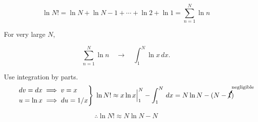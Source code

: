 
\begin{equation}
    \ln{N!} = \ln{N}+\ln{N-1}+\cdots+\ln{2}+\ln{1}=\sum^N_{n=1}\ln{n}
\end{equation}

For very large $N$,

\begin{equation}
    \sum^N_{n=1}\ln{n} \quad \longrightarrow  \quad \int_{1}^{N} \ln{x} \,dx .
\end{equation}

Use integration by parts.
\begin{equation}
    \begin{rcases}
        dv=dx \implies v=x \\ u=\ln{x} \implies du=1/x
    \end{rcases}\;
    \ln{N!}\approx x\ln{x}\Big|_1^N - \int_1^N \,dx = N\ln{N}-(N-\cancelto{\scriptsize{\textrm{negligible}}}{1})
\end{equation}

\begin{equation}
    \therefore \ln{N!}\approx N \ln{N} - N
\end{equation}